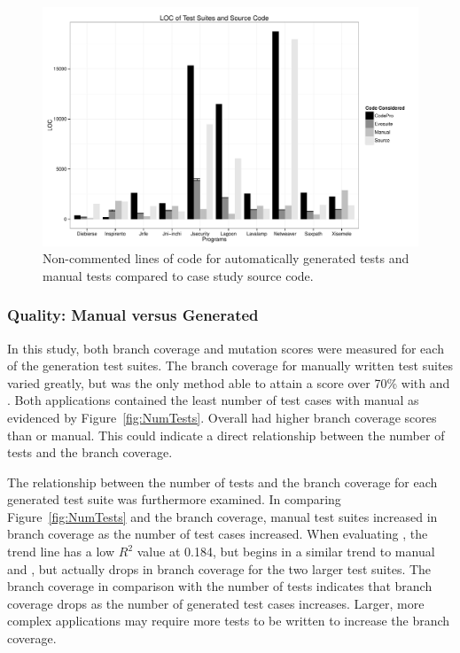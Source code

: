 


\begin{figure}[!t]
\centering
  \includegraphics[scale=0.5]{RGraphs/LOC.pdf}
    \caption{Non-commented lines of code for automatically generated tests and manual tests compared to case study source code. }
  \label{fig:LOC}
\end{figure}


\subsubsection{Quality: Manual versus Generated}
In this study, both branch coverage and mutation scores were measured for each of the generation test suites. The branch coverage for manually written test suites varied greatly, but was the only method  able to attain a score over 70\% with \lavalamp and \xisemele. Both applications contained the least number of test cases with manual as evidenced by  Figure~\ref{fig:NumTests}. Overall \codepro had higher branch coverage scores than \evo or manual. This could indicate a direct relationship between the number of tests and the branch coverage. 

The relationship between the number of tests and the branch coverage for each generated test suite was furthermore examined. In comparing Figure~\ref{fig:NumTests} and the branch coverage, manual test suites increased in branch coverage as the number of test cases increased. When evaluating \evo, the trend line has a low  $R^2$ value at 0.184, but begins in a similar trend to manual and \codepro, but actually drops in branch coverage for the two larger test suites. The branch coverage in comparison with the number of tests indicates that \codepro branch coverage drops as the number of generated test cases increases. Larger, more complex applications may require more tests to be written to increase the branch coverage. 

